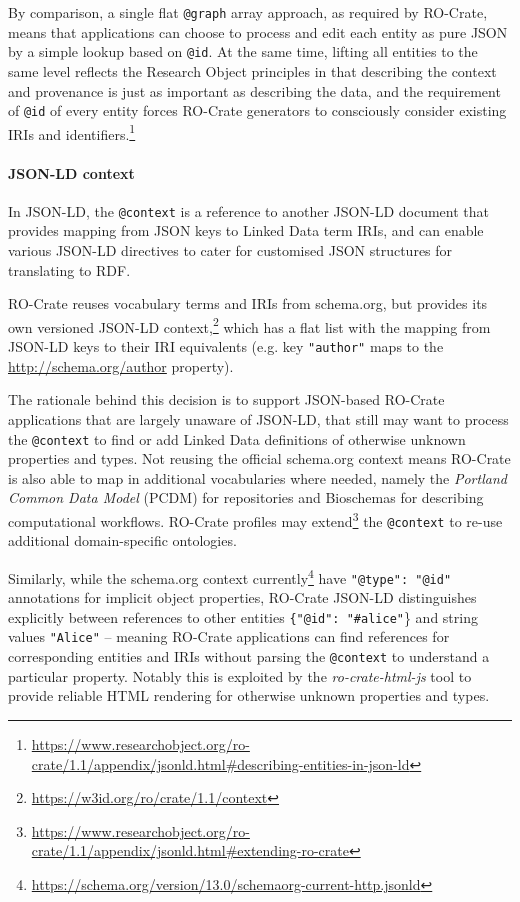By comparison, a single flat \texttt{@graph} array approach, as required
by RO-Crate, means that applications can choose to process and edit each
entity as pure JSON by a simple lookup based on \texttt{@id}. At the
same time, lifting all entities to the same level reflects the Research
Object principles
\cite{Bechhofer 2013}
in that describing the context and provenance is just as important as
describing the data, and the requirement of \texttt{@id} of every entity
forces RO-Crate generators to consciously
consider
existing IRIs and identifiers.\footnote{\url{https://www.researchobject.org/ro-crate/1.1/appendix/jsonld.html\#describing-entities-in-json-ld}}

\paragraph{JSON-LD context}\label{ch5:json-ld-context}

In JSON-LD, the \texttt{@context} is a reference to another JSON-LD
document that provides mapping from JSON keys to Linked Data term IRIs,
and can enable various JSON-LD directives to cater for customised JSON
structures for translating to RDF.

RO-Crate reuses vocabulary terms and IRIs from schema.org, but provides
its own versioned JSON-LD
context,\footnote{\url{https://w3id.org/ro/crate/1.1/context}} which has a flat list
with the mapping from JSON-LD keys to their IRI equivalents (e.g. key
\texttt{"author"} maps to the \url{http://schema.org/author} property).

The rationale behind this decision is to support JSON-based RO-Crate
applications that are largely unaware of JSON-LD, that still may want to
process the \texttt{@context} to find or add Linked Data definitions of
otherwise unknown properties and types. Not reusing the official
schema.org context means RO-Crate is also able to map in additional
vocabularies where needed, namely the \emph{Portland Common Data Model}
(PCDM) \cite{Cossu 2018}
for
repositories and Bioschemas \cite{Gray 2017}
for
describing computational workflows. RO-Crate profiles may
extend\footnote{\url{https://www.researchobject.org/ro-crate/1.1/appendix/jsonld.html\#extending-ro-crate}}
the \texttt{@context} to re-use additional domain-specific ontologies.


Similarly, while the schema.org context
currently\footnote{\url{https://schema.org/version/13.0/schemaorg-current-http.jsonld}}
have \texttt{"@type": "@id"} annotations for implicit object properties, RO-Crate
JSON-LD distinguishes explicitly between references to other entities
\texttt{\{"@id": "\#alice"}\}
and string values \texttt{"Alice"} -- meaning
RO-Crate applications can find references for corresponding entities
and IRIs without parsing the \texttt{@context} to understand a particular
property. Notably this is exploited by the \textit{ro-crate-html-js}
\cite{ch5-95} tool to provide reliable HTML rendering for
otherwise unknown properties and types.

